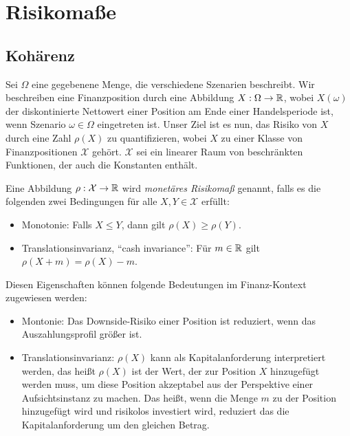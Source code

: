 \documentclass[a4paper,twoside,DIV15,BCOR12mm]{scrbook}
\newcommand{\cX}{\mathcal X}
\newcommand{\monsucceq}{\succeq_{\text{mon}}}
\begin{document}
\begin{center}
\end{center}


\section{Risikomaße}
\subsection{Kohärenz}

Sei $\Omega$ eine gegebenene Menge, die verschiedene Szenarien beschreibt. Wir beschreiben eine Finanzposition durch eine Abbildung $X:\Omega\to \mathbb{R}$, wobei $X(\omega)$ der diskontinierte Nettowert einer Position am Ende einer Handelsperiode ist, wenn Szenario $\omega\in\Omega$ eingetreten ist. Unser Ziel ist es nun, das Risiko von $X$ durch eine Zahl $\rho(X)$ zu quantifizieren, wobei $X$ zu einer Klasse von Finanzpositionen $\cX$ gehört. $\cX$ sei ein linearer Raum von beschränkten Funktionen, der auch die Konstanten enthält.

\begin{definition}
Eine Abbildung $\rho:\cX\to\MdR$ wird \emph{monetäres Risikomaß} genannt, falls es die folgenden zwei Bedingungen für alle $X,Y\in\cX$ erfüllt:
\begin{itemize}
\item Monotonie: Falls $X\le Y$, dann gilt $\rho(X)\ge \rho(Y)$.
\item Translationsinvarianz, “cash invariance”: Für $m\in\mathbb{R}$ gilt $\rho(X + m) = \rho(X) - m$.
\end{itemize}
\end{definition}

Diesen Eigenschaften können folgende Bedeutungen im Finanz-Kontext zugewiesen werden:
\begin{itemize}
\item Montonie: Das Downside-Risiko einer Position ist reduziert, wenn das Auszahlungsprofil größer ist.
\item Translationsinvarianz: $\rho(X)$ kann als Kapitalanforderung interpretiert werden, das heißt $\rho(X)$ ist der Wert, der zur Position $X$ hinzugefügt werden muss, um diese Position akzeptabel aus der Perspektive einer Aufsichtsinstanz zu machen. Das heißt, wenn die Menge $m$ zu der Position hinzugefügt wird und risikolos investiert wird, reduziert das die Kapitalanforderung um den gleichen Betrag.
\end{itemize}
\end{document}
